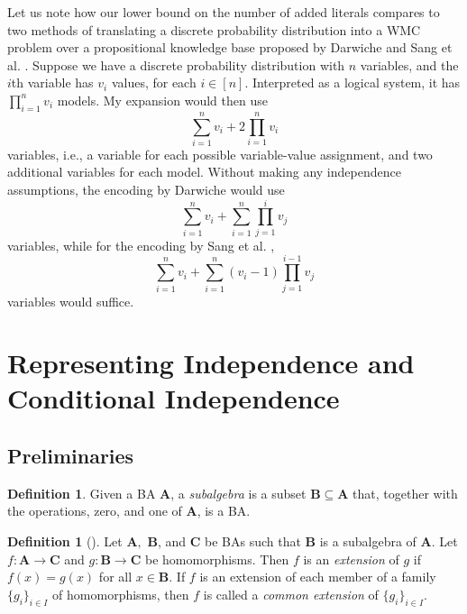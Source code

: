 \documentclass{article}
\theoremstyle{definition}
\newtheorem{definition}[theorem]{Definition}
\theoremstyle{remark}
\begin{document}

Let us note how our lower bound on the number of added literals compares to two
methods of translating a discrete probability distribution into a WMC problem
over a propositional knowledge base proposed by Darwiche
\cite{DBLP:conf/kr/Darwiche02} and Sang et al. \cite{DBLP:conf/aaai/SangBK05}.
Suppose we have a discrete probability distribution with  $n$ variables, and the
$i$th variable has $v_i$ values, for each $i \in [n]$. Interpreted as a logical
system, it has $\prod_{i=1}^n v_i$ models. My expansion would then use
\[
  \sum_{i=1}^n v_i + 2\prod_{i=1}^n v_i
\]
variables, i.e., a variable for each possible variable-value assignment, and two
additional variables for each model. Without making any independence
assumptions, the encoding by Darwiche \cite{DBLP:conf/kr/Darwiche02} would use
\[
  \sum_{i=1}^n v_i + \sum_{i=1}^n \prod_{j=1}^i v_j
\]
variables, while for the encoding by Sang et al. \cite{DBLP:conf/aaai/SangBK05},
\[
  \sum_{i=1}^n v_i + \sum_{i=1}^n (v_i - 1) \prod_{j=1}^{i-1} v_j
\]
variables would suffice.

\section{Representing Independence and Conditional Independence}

\subsection{Preliminaries}

\begin{definition}
  Given a BA $\mathbf{A}$, a \emph{subalgebra} is a subset $\mathbf{B} \subseteq
  \mathbf{A}$ that, together with the operations, zero, and one of $\mathbf{A}$,
  is a BA.
\end{definition}

\begin{definition}[\cite{givant2008introduction}]
  Let $\mathbf{A},$ $\mathbf{B}$, and $\mathbf{C}$ be BAs such that $\mathbf{B}$
  is a subalgebra of $\mathbf{A}$. Let $f\colon \mathbf{A} \to \mathbf{C}$ and
  $g\colon \mathbf{B} \to \mathbf{C}$ be homomorphisms. Then $f$ is an
  \emph{extension} of $g$ if $f(x) = g(x)$ for all $x \in \mathbf{B}$. If $f$ is
  an extension of each member of a family $\{ g_i \}_{i \in I}$ of
  homomorphisms, then $f$ is called a \emph{common extension} of $\{ g_i \}_{i
    \in I}$.
\end{definition}
\end{document}

